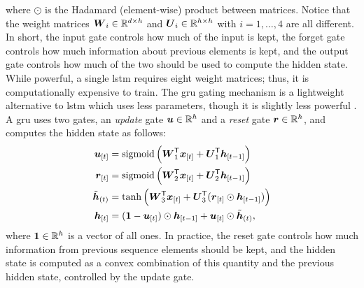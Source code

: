 where $\odot$ is the Hadamard (element-wise) product between matrices. Notice that the weight matrices $\Matrix{W}_i \in \Real^{d \times h}$ and $\Matrix{U}_i \in \Real^{h \times h}$ with $i=1, \ldots, 4$ are all different. In short, the input gate controls how much of the input is kept, the forget gate controls how much information about previous elements is kept, and the output gate controls how much of the two should be used to compute the hidden state. While powerful, a single \gls{lstm} requires eight weight matrices; thus, it is computationally expensive to train. The \gls{gru} \citep{cho2014gru} gating mechanism is a lightweight alternative to \gls{lstm} which uses less parameters, though it is slightly less powerful \citep{gruber2020gruspecificlstm}. A \gls{gru} uses two gates, an \emph{update} gate $\Vector{u} \in \Real^h$ and a \emph{reset} gate $\Vector{r} \in \Real^h$, and computes the hidden state as follows:
\begin{align*}
    \Elem{u}{t} &= \sigmoid\Par{\Matrix{W}_{1}^{\Transpose}\Elem{x}{t} + \Matrix{U}_{1}^{\Transpose}\Elem{h}{t-1}}\\
    \Elem{r}{t} &= \sigmoid\Par{\Matrix{W}_{2}^{\Transpose}\Elem{x}{t} + \Matrix{U}_{2}^{\Transpose}\Elem{h}{t-1}}\\
    \tilde{\Vector{h}}_{(t)} &= \tanh\Par{\Matrix{W}_{3}^{\Transpose}\Elem{x}{t} + \Matrix{U}_{3}^{\Transpose}(\Elem{r}{t} \odot \Elem{h}{t-1})}\\
    \Elem{h}{t} &= (\boldsymbol{1} - \Elem{u}{t}) \odot \Elem{h}{t-1} + \Elem{u}{t} \odot \tilde{\Vector{h}}_{(t)},
\end{align*}
where $\boldsymbol{1} \in \mathbb{R}^h$ is a vector of all ones. In practice, the reset gate controls how much information from previous sequence elements should be kept, and the hidden state is computed as a convex combination of this quantity and the previous hidden state, controlled by the update gate.

